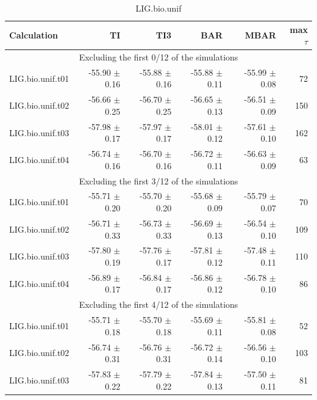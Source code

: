 \documentclass[journal=jctcce,manuscript=article,hyperref=false]{achemso}
\begin{document}
\begin{table}
\caption{LIG.bio.unif}
{\small
\begin{tabular}{l r r r r r}
\hline
                             Calculation &                 TI &                TI3 &                BAR &               MBAR & max $\tau$\\
\hline\multicolumn{6}{c}{Excluding the first 0/12 of the simulations} \\
                        LIG.bio.unif.t01 &  -55.90 $\pm$    0.16 &  -55.88 $\pm$    0.16 &  -55.88 $\pm$    0.11 &  -55.99 $\pm$    0.08 &      72 \\
                        LIG.bio.unif.t02 &  -56.66 $\pm$    0.25 &  -56.70 $\pm$    0.25 &  -56.65 $\pm$    0.13 &  -56.51 $\pm$    0.09 &     150 \\
                        LIG.bio.unif.t03 &  -57.98 $\pm$    0.17 &  -57.97 $\pm$    0.17 &  -58.01 $\pm$    0.12 &  -57.61 $\pm$    0.10 &     162 \\
                        LIG.bio.unif.t04 &  -56.74 $\pm$    0.16 &  -56.70 $\pm$    0.16 &  -56.72 $\pm$    0.11 &  -56.63 $\pm$    0.09 &      63 \\
\multicolumn{6}{c}{Excluding the first 3/12 of the simulations} \\
                        LIG.bio.unif.t01 &  -55.71 $\pm$    0.20 &  -55.70 $\pm$    0.20 &  -55.68 $\pm$    0.09 &  -55.79 $\pm$    0.07 &      70 \\
                        LIG.bio.unif.t02 &  -56.71 $\pm$    0.33 &  -56.73 $\pm$    0.33 &  -56.69 $\pm$    0.13 &  -56.54 $\pm$    0.10 &     109 \\
                        LIG.bio.unif.t03 &  -57.80 $\pm$    0.19 &  -57.76 $\pm$    0.17 &  -57.81 $\pm$    0.12 &  -57.48 $\pm$    0.11 &     110 \\
                        LIG.bio.unif.t04 &  -56.89 $\pm$    0.17 &  -56.84 $\pm$    0.17 &  -56.86 $\pm$    0.12 &  -56.78 $\pm$    0.10 &      86 \\
\multicolumn{6}{c}{Excluding the first 4/12 of the simulations} \\
                        LIG.bio.unif.t01 &  -55.71 $\pm$    0.18 &  -55.70 $\pm$    0.18 &  -55.69 $\pm$    0.11 &  -55.81 $\pm$    0.08 &      52 \\
                        LIG.bio.unif.t02 &  -56.74 $\pm$    0.31 &  -56.76 $\pm$    0.31 &  -56.72 $\pm$    0.14 &  -56.56 $\pm$    0.10 &     103 \\
                        LIG.bio.unif.t03 &  -57.83 $\pm$    0.22 &  -57.79 $\pm$    0.22 &  -57.84 $\pm$    0.13 &  -57.50 $\pm$    0.11 &      81 \\

\end{tabular}}
\end{table}
\end{document}

